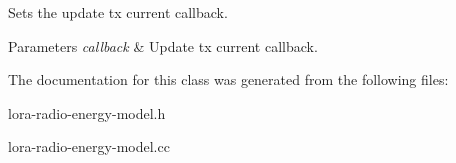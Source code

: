 Sets the update tx current callback. 


\begin{DoxyParams}{Parameters}
{\em callback} & Update tx current callback. \\
\hline
\end{DoxyParams}


The documentation for this class was generated from the following files\+:\begin{DoxyCompactItemize}
\item 
lora-\/radio-\/energy-\/model.\+h\item 
lora-\/radio-\/energy-\/model.\+cc\end{DoxyCompactItemize}
